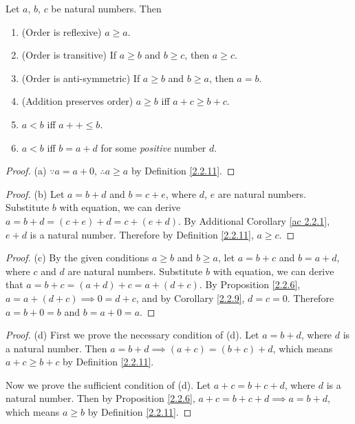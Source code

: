 \begin{proposition}\label{2.2.12}
Let \(a\), \(b\), \(c\) be natural numbers.
Then
\begin{enumerate}
\item (Order is reflexive) \(a \geq a\).
\item (Order is transitive) If \(a \geq b\) and \(b \geq c\), then \(a \geq c\).
\item (Order is anti-symmetric) If \(a \geq b\) and \(b \geq a\), then \(a = b\).
\item (Addition preserves order) \(a \geq b\) iff \(a + c \geq b + c\).
\item \(a < b\) iff \(a++ \leq b\).
\item \(a < b\) iff \(b = a + d\) for some \emph{positive} number \(d\).
\end{enumerate}
\end{proposition}

\begin{proof}{(a)}
\(\because a = a + 0\), \(\therefore a \geq a\) by Definition \ref{2.2.11}.
\end{proof}

\begin{proof}{(b)}
Let \(a = b + d\) and \(b = c + e\), where \(d\), \(e\) are natural numbers.
Substitute \(b\) with equation, we can derive \(a = b + d = (c + e) + d = c + (e + d)\).
By Additional Corollary \ref{ac 2.2.1}, \(e + d\) is a natural number.
Therefore by Definition \ref{2.2.11}, \(a \geq c\).
\end{proof}

\begin{proof}{(c)}
By the given conditions \(a \geq b\) and \(b \geq a\), let \(a = b + c\) and \(b = a + d\), where \(c\) and \(d\) are natural numbers.
Substitute \(b\) with equation, we can derive that \(a = b + c = (a + d) + c = a + (d + c)\).
By Proposition \ref{2.2.6}, \(a = a + (d + c) \implies 0 = d + c\), and by Corollary \ref{2.2.9}, \(d = c = 0\).
Therefore \(a = b + 0 = b\) and \(b = a + 0 = a\).
\end{proof}

\begin{proof}{(d)}
First we prove the necessary condition of (d).
Let \(a = b + d\), where \(d\) is a natural number.
Then \(a = b + d \implies (a + c) = (b + c) + d\), which means \(a + c \geq b + c\) by Definition \ref{2.2.11}.

Now we prove the sufficient condition of (d).
Let \(a + c = b + c + d\), where \(d\) is a natural number.
Then by Proposition \ref{2.2.6}, \(a + c = b + c + d \implies a = b + d\), which means \(a \geq b\) by Definition \ref{2.2.11}.
\end{proof}


